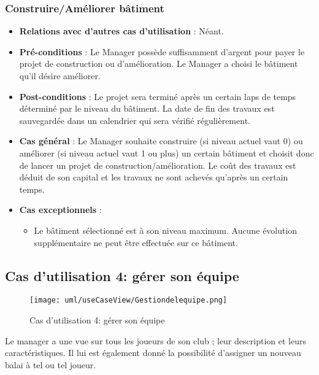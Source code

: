 \documentclass[a4paper,titlepage]{scrreprt}
\begin{document}
    \subsubsection{Construire/Améliorer bâtiment}
      \begin{itemize}
        \item \textbf{Relations avec d'autres cas d'utilisation}  : Néant.
        \item \textbf{Pré-conditions} : Le Manager possède suffisamment d’argent pour payer le projet de construction ou d’amélioration. Le Manager a choisi le bâtiment qu’il désire améliorer.
        \item \textbf{Post-conditions} : Le projet sera terminé après un certain laps de temps déterminé par le niveau du bâtiment. La date de fin des travaux est sauvegardée dans un \gls{calendrier} qui sera vérifié régulièrement.
        \item \textbf{Cas général} : Le Manager souhaite construire (si niveau actuel vaut 0) ou améliorer (si niveau actuel vaut 1 ou plus) un certain bâtiment et choisit donc de lancer un projet de construction/amélioration. Le coût des travaux est déduit de son capital et les travaux ne sont achevés qu'après un certain temps.
        \item \textbf{Cas exceptionnels} :
        \begin{itemize}
            \item Le bâtiment sélectionné est à son niveau maximum. Aucune évolution supplémentaire ne peut être effectuée sur ce bâtiment.
          \end{itemize}
      \end{itemize}

  \subsection{Cas d'utilisation 4: gérer son équipe}
  \begin{figure}[H]
    \center
    \texttt{[image: uml/useCaseView/Gestiondelequipe.png]}
    \caption{Cas d'utilisation 4: gérer son équipe}
  \end{figure}	
  Le manager a une vue sur tous les joueurs de son \gls{club} ;  
  leur description et leurs caractéristiques. 
  Il lui est également donné la possibilité d'assigner un nouveau balai à tel ou tel joueur.
\end{document}
